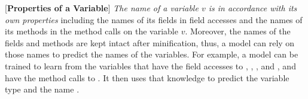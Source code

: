 \vspace{2pt}
 [{\bf Properties of a Variable}] {\em The
  name of a variable $v$ is in accordance with its own properties}
including the names of its fields in field accesses and the names of
its methods in the method calls on the variable $v$.
%
Moreover, the names of the fields and methods are kept intact after
minification, thus, a model can rely on those names to predict the
names of the variables. For example, a model can be trained to learn
from the variables that have the field accesses to
, , , and
, and have the method calls to .
It then uses that knowledge to predict the variable type and the name
.

















